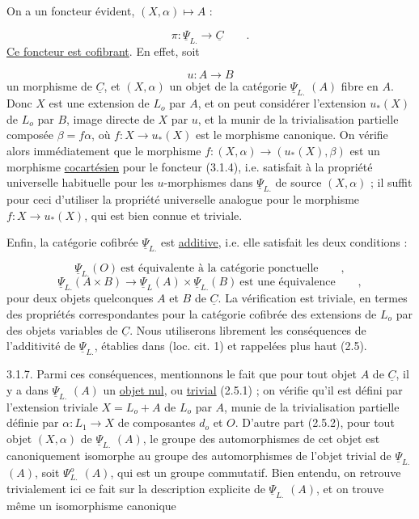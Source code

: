 On a un foncteur évident, $(X,\alpha) \longmapsto A$ :

\begin{equation}\tag{3.1.4}
\pi : \underline{\Psi}_{L.} \longrightarrow \underline{C} \qquad .
\end{equation}
\underline{Ce foncteur est cofibrant}. En effet, soit

\begin{equation*}
u: A \longrightarrow B
\end{equation*}
un morphisme de $\underline{C}$, et $(X,\alpha)$ un objet de la catégorie $\underline{\Psi}_{L.}$ $(A)$ fibre en $A$. Donc $X$ est une extension de $L_o$ par $A$, et on peut considérer l'extension $u_*(X)$ de $L_o$ par $B$, image directe de $X$ par $u$, et la munir de la trivialisation partielle composée $\beta = f\alpha$, où $f : X \longrightarrow u_*(X)$ est le morphisme canonique. On vérifie alors immédiatement que le morphisme $f : (X,\alpha) \longrightarrow (u_*(X),\beta)$ est un morphisme \underline{cocartésien} pour le foncteur (3.1.4), i.e. satisfait à la propriété universelle habituelle pour les $u$-morphismes dans $\underline{\Psi}_{L.}$ de source $(X,\alpha)$ ; il suffit pour ceci d'utiliser la propriété universelle analogue pour le morphisme $f : X \longrightarrow u_*(X)$, qui est bien connue et triviale.

Enfin, la catégorie cofibrée $\underline{\Psi}_{L.}$ est \underline{additive}, i.e. elle satisfait les deux conditions :

\begin{equation}\tag{3.1.5}
\underline{\Psi}_{L.} (O) \ \text{est équivalente à la catégorie ponctuelle} \qquad ,
\end{equation}
\begin{equation}\tag{3.1.6}
\underline{\Psi}_{L.} (A \times B) \longrightarrow \underline{\Psi}_{L}(A) \times \underline{\Psi}_{L.} (B) \ \text{est une équivalence} \qquad ,
\end{equation}
pour deux objets quelconques $A$ et $B$ de $\underline{C}$. La vérification est triviale, en termes des propriétés correspondantes pour la catégorie cofibrée des extensions de $L_o$ par des objets variables de $\underline{C}$. Nous utiliserons librement
les conséquences de l'additivité de $\underline{\Psi}_{L.}$, établies dans (loc. cit. 1) et rappelées plus haut (2.5).

3.1.7.  Parmi ces conséquences, mentionnons le fait que pour tout objet $A$ de $\underline{C}$, il y a dans $\underline{\Psi}_{L.}$ $(A)$ un \underline{objet nul}, ou \underline{trivial} (2.5.1) ; on vérifie qu'il est défini par l'extension triviale $X = L_o + A$ de $L_o$ par $A$, munie de la trivialisation partielle définie par $\alpha : L_1 \longrightarrow X$ de composantes $d_o$ et $O$. D'autre part (2.5.2), pour tout objet $(X,\alpha)$ de $\underline{\Psi}_{L.}$ $(A)$, le groupe des automorphismes de cet objet est canoniquement isomorphe au groupe des automorphismes de l'objet trivial de $\underline{\Psi}_{L.}$ $(A)$, soit $\Psi^{o}_{L.}$ $(A)$, qui est un groupe commutatif. Bien entendu, on retrouve trivialement ici ce fait sur la description explicite de $\underline{\Psi}_{L.}$ $(A)$, et on trouve même un isomorphisme canonique

